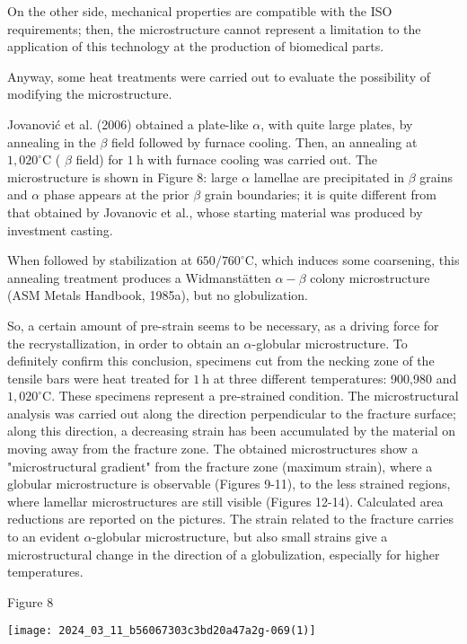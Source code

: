 \documentclass[10pt]{article}
\begin{document}
On the other side, mechanical properties are compatible with the ISO requirements; then, the microstructure cannot represent a limitation to the application of this technology at the production of biomedical parts.

Anyway, some heat treatments were carried out to evaluate the possibility of modifying the microstructure.

Jovanović et al. (2006) obtained a plate-like $\alpha$, with quite large plates, by annealing in the $\beta$ field followed by furnace cooling. Then, an annealing at $1,020^{\circ} \mathrm{C}$ ( $\beta$ field) for $1 \mathrm{~h}$ with furnace cooling was carried out. The microstructure is shown in Figure 8: large $\alpha$ lamellae are precipitated in $\beta$ grains and $\alpha$ phase appears at the prior $\beta$ grain boundaries; it is quite different from that obtained by Jovanovic et al., whose starting material was produced by investment casting.

When followed by stabilization at $650 / 760^{\circ} \mathrm{C}$, which induces some coarsening, this annealing treatment produces a Widmanstätten $\alpha-\beta$ colony microstructure (ASM Metals Handbook, 1985a), but no globulization.

So, a certain amount of pre-strain seems to be necessary, as a driving force for the recrystallization, in order to obtain an $\alpha$-globular microstructure. To definitely confirm this conclusion, specimens cut from the necking zone of the tensile bars were heat treated for $1 \mathrm{~h}$ at three different temperatures: 900,980 and $1,020^{\circ} \mathrm{C}$. These specimens represent a pre-strained condition. The microstructural analysis was carried out along the direction perpendicular to the fracture surface; along this direction, a decreasing strain has been accumulated by the material on moving away from the fracture zone. The obtained microstructures show a "microstructural gradient" from the fracture zone (maximum strain), where a globular microstructure is observable (Figures 9-11), to the less strained regions, where lamellar microstructures are still visible (Figures 12-14). Calculated area reductions are reported on the pictures. The strain related to the fracture carries to an evident $\alpha$-globular microstructure, but also small strains give a microstructural change in the direction of a globulization, especially for higher temperatures.

Figure 8

\begin{center}
\texttt{[image: 2024\_03\_11\_b56067303c3bd20a47a2g-069(1)]}
\end{center}
\end{document}
